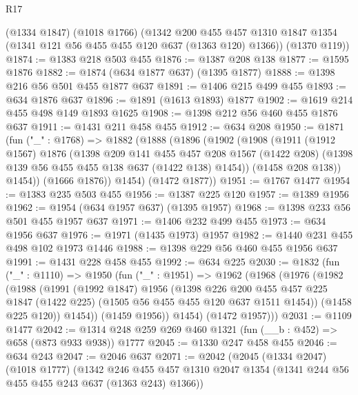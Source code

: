\begin{lexlean}{R17}
\begin{coremodule}
      (@1334 @1847)
      (@1018 @1766)
      (@1342
        @200
        @455
        @457
        @1310
        @1847
        @1354
        (@1341 @121 @56 @455 @455 @120 @637 (@1363 @120) @1366))
      (@1370 @119))
@1874 := @1383 @218 @503 @455
@1876 := @1387 @208 @138
@1877 := @1595 @1876
@1882 := @1874 (@634 @1877 @637) (@1395 @1877)
@1888 := @1398 @216 @56 @501 @455 @1877 @637
@1891 := @1406 @215 @499 @455
@1893 := @634 @1876 @637
@1896 := @1891 (@1613 @1893) @1877
@1902 := @1619 @214 @455 @498 @149 @1893 @1625
@1908 := @1398 @212 @56 @460 @455 @1876 @637
@1911 := @1431 @211 @458 @455
@1912 := @634 @208
@1950 := @1871
    (fun ("_" : @1768) =>
    @1882
      (@1888
        (@1896
          (@1902
            (@1908
              (@1911
                (@1912 @1567)
                @1876
                (@1398
                  @209
                  @141
                  @455
                  @457
                  @208
                  @1567
                  (@1422 @208)
                  (@1398 @139 @56 @455 @455 @138 @637 (@1422 @138) @1454))
                (@1458 @208 @138))
              @1454))
          (@1666 @1876))
        @1454)
      (@1472 @1877))
@1951 := @1767 @1477
@1954 := @1383 @235 @503 @455
@1956 := @1387 @225 @120
@1957 := @1389 @1956
@1962 := @1954 (@634 @1957 @637) (@1395 @1957)
@1968 := @1398 @233 @56 @501 @455 @1957 @637
@1971 := @1406 @232 @499 @455
@1973 := @634 @1956 @637
@1976 := @1971 (@1435 @1973) @1957
@1982 := @1440 @231 @455 @498 @102 @1973 @1446
@1988 := @1398 @229 @56 @460 @455 @1956 @637
@1991 := @1431 @228 @458 @455
@1992 := @634 @225
@2030 := @1832
    (fun ("_" : @1110) =>
    @1950
      (fun ("_" : @1951) =>
      @1962
        (@1968
          (@1976
            (@1982
              (@1988
                (@1991
                  (@1992 @1847)
                  @1956
                  (@1398
                    @226
                    @200
                    @455
                    @457
                    @225
                    @1847
                    (@1422 @225)
                    (@1505 @56 @455 @455 @120 @637 @1511 @1454))
                  (@1458 @225 @120))
                @1454))
            (@1459 @1956))
          @1454)
        (@1472 @1957)))
@2031 := @1109 @1477
@2042 := @1314 @248 @259 @269 @460 @1321 (fun (__b : @452) => @658 (@873 @933 @938)) @1777
@2045 := @1330 @247 @458 @455
@2046 := @634 @243
@2047 := @2046 @637
@2071 := @2042
    (@2045
      (@1334 @2047)
      (@1018 @1777)
      (@1342
        @246
        @455
        @457
        @1310
        @2047
        @1354
        (@1341 @244 @56 @455 @455 @243 @637 (@1363 @243) @1366))

\end{coremodule}
\end{lexlean}
